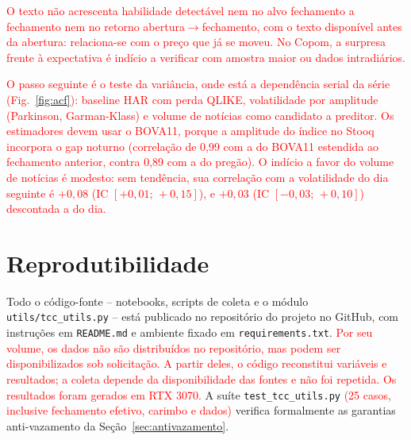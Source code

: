 \documentclass[conference]{IEEEtran}
\newcommand{\novo}[1]{\textcolor{red}{#1}}
\begin{document}
\novo{O texto n\~ao acrescenta habilidade detect\'avel nem no alvo fechamento a fechamento nem no retorno abertura$\to$fechamento, com o texto dispon\'ivel antes da abertura: relaciona-se com o pre\c{c}o que j\'a se moveu. No Copom, a surpresa frente \`a expectativa \'e ind\'icio a verificar com amostra maior ou dados intradi\'arios.}

\novo{O passo seguinte \'e o teste da vari\^ancia, onde est\'a a depend\^encia serial da s\'erie (Fig.~\ref{fig:acf}): baseline HAR \cite{corsi2009} com perda QLIKE, volatilidade por amplitude (Parkinson, Garman-Klass) e volume de not\'icias como candidato a preditor. Os estimadores devem usar o BOVA11, porque a amplitude do \'indice no Stooq incorpora o gap noturno (correla\c{c}\~ao de 0,99 com a do BOVA11 estendida ao fechamento anterior, contra 0,89 com a do preg\~ao). O ind\'icio a favor do volume de not\'icias \'e modesto: sem tend\^encia, sua correla\c{c}\~ao com a volatilidade do dia seguinte \'e $+0{,}08$ (IC $[+0{,}01;\,+0{,}15]$), e $+0{,}03$ (IC $[-0{,}03;\,+0{,}10]$) descontada a do dia.}

\section*{Reprodutibilidade}
Todo o c\'odigo-fonte -- notebooks, scripts de coleta e o m\'odulo \texttt{utils/tcc\_utils.py} -- est\'a publicado no reposit\'orio do projeto no GitHub, com instru\c{c}\~oes em \texttt{README.md} e ambiente fixado em \texttt{requirements.txt}. \novo{Por seu volume, os dados n\~ao s\~ao distribu\'idos no reposit\'orio, mas podem ser disponibilizados sob solicita\c{c}\~ao. A partir deles, o c\'odigo reconstitui vari\'aveis e resultados; a coleta depende da disponibilidade das fontes e n\~ao foi repetida.} \novo{Os resultados foram gerados em RTX 3070.} A su\'ite \texttt{test\_tcc\_utils.py} \novo{(25 casos, inclusive fechamento efetivo, carimbo e dados)} verifica formalmente as garantias anti-vazamento da Se\c{c}\~ao~\ref{sec:antivazamento}.
\end{document}
